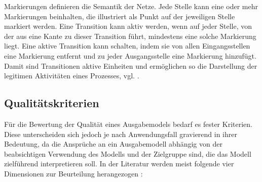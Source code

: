Markierungen definieren die Semantik der Netze. Jede Stelle kann eine oder mehr Markierungen beinhalten, die illustriert als Punkt auf der jeweiligen Stelle markiert werden. Eine Transition kann aktiv werden, wenn auf jeder Stelle, von der aus eine Kante zu dieser Transition führt, mindestens eine solche Markierung liegt. Eine aktive Transition kann schalten, indem sie von allen Eingangsstellen eine Markierung entfernt und zu jeder Ausgangsstelle eine Markierung hinzufügt. Damit sind Transitionen aktive Einheiten und ermöglichen so die Darstellung der legitimen Aktivitäten eines Prozesses, vgl. \cite{Petrinetze}.
\newpage
\subsection{Qualitätskriterien}\label{sec:quality}
Für die Bewertung der Qualität eines Ausgabemodels  bedarf es fester Kriterien. Diese unterscheiden sich jedoch je nach Anwendungsfall gravierend in ihrer Bedeutung, da die Ansprüche an ein Ausgabemodell abhängig von der beabsichtigen Verwendung des Modells und der Zielgruppe sind, die das Modell zielführend interpretieren soll. In der Literatur werden meist folgende vier Dimensionen zur Beurteilung herangezogen \cite{PMinAction}:

